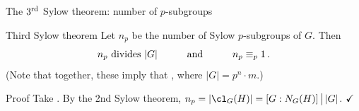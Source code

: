 \documentclass[8pt, handout]{beamer}
\newcommand{\Pause}{}      %
\begin{document}
\begin{frame}{The $3^{\rm rd}$ Sylow theorem: number of $p$-subgroups}

  \begin{block}{Third Sylow theorem}
    Let $n_p$ be the number of Sylow $p$-subgroups of $G$.  Then
    \[
    \mbox{$n_p$ divides $|G|$}\qquad\quad\mbox{and}\qquad\quad
    n_p\equiv_p 1\,. \vspace{-2mm}\Pause
    \]
    (Note that together, these imply that , where
    $|G|=p^n\cdot m$.)
  \end{block}

  \Pause

  \begin{exampleblock}{Proof} %
    Take . By the 2nd Sylow theorem,
    $n_p=|\cl_G(H)|=[G:N_G(H)]\,\big|\,|G|$. $\hfill\checkmark$ \medskip\Pause
    

\end{exampleblock}
\end{frame}
\end{document}

